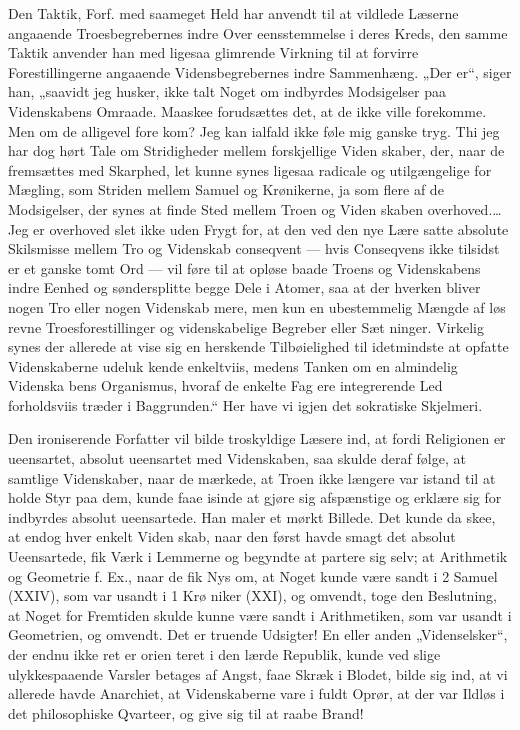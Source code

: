 \documentclass[12pt]{book}
\newcommand{\opage}[1]{\marginnote{\footnotesize\textit{[#1]}}}
\begin{document}
Den Taktik, Forf. med saameget Held har anvendt til
at vildlede Læserne angaaende Troesbegrebernes indre Over\-%
eensstemmelse i deres Kreds, den samme Taktik anvender han
med ligesaa glimrende Virkning til at forvirre Forestillingerne
angaaende Vidensbegrebernes indre Sammenhæng. „Der er“,
siger han, „saavidt jeg husker, ikke talt Noget om indbyrdes
Modsigelser paa Videnskabens Omraade. Maaskee forudsættes
det, at de ikke ville forekomme. Men om de alligevel fore\-%
kom? Jeg kan ialfald ikke føle mig ganske tryg. Thi jeg
har dog hørt Tale om Stridigheder mellem forskjellige Viden\-%
skaber, der, naar de fremsættes med Skarphed, let kunne
synes ligesaa radicale og utilgængelige for Mægling, som
Striden mellem Samuel og Krønikerne, ja som flere af de
Modsigelser, der synes at finde Sted mellem Troen og Viden\-%
skaben overhoved.\ldots{} Jeg er overhoved slet ikke uden Frygt
for, at den ved den nye Lære satte absolute Skilsmisse mellem
Tro og Videnskab conseqvent --- hvis Conseqvens ikke tilsidst
er et ganske tomt Ord --- vil føre til at opløse baade Troens
og Videnskabens indre Eenhed og søndersplitte begge Dele i
Atomer, saa at der hverken bliver nogen Tro eller nogen
Videnskab mere, men kun en ubestemmelig Mængde af løs\-%
revne Troesforestillinger og videnskabelige Begreber eller Sæt\-%
ninger. Virkelig synes der allerede at vise sig en herskende
Tilbøielighed til idetmindste at opfatte Videnskaberne udeluk\-%
kende enkeltviis, medens Tanken om en almindelig Videnska\-%
bens Organismus, hvoraf de enkelte Fag ere integrerende Led
\opage{317}\setcounter{footnote}{0}%
forholdsviis træder i Baggrunden.“ Her have vi igjen det
sokratiske Skjelmeri.

Den ironiserende Forfatter vil bilde troskyldige Læsere
ind, at fordi Religionen er ueensartet, absolut ueensartet med
Videnskaben, saa skulde deraf følge, at samtlige Videnskaber,
naar de mærkede, at Troen ikke længere var istand til at holde
Styr paa dem, kunde faae isinde at gjøre sig afspænstige og
erklære sig for indbyrdes absolut ueensartede. Han maler et
mørkt Billede. Det kunde da skee, at endog hver enkelt Viden\-%
skab, naar den først havde smagt det absolut Ueensartede, fik
Værk i Lemmerne og begyndte at partere sig selv; at Arithmetik
og Geometrie f. Ex., naar de fik Nys om, at Noget kunde
være sandt i 2 Samuel (XXIV), som var usandt i 1 Krø\-%
niker (XXI), og omvendt, toge den Beslutning, at Noget for
Fremtiden skulde kunne være sandt i Arithmetiken, som var
usandt i Geometrien, og omvendt. Det er truende Udsigter!
En eller anden „Videnselsker“, der endnu ikke ret er orien\-%
teret i den lærde Republik, kunde ved slige ulykkespaaende
Varsler betages af Angst, faae Skræk i Blodet, bilde sig ind,
at vi allerede havde Anarchiet, at Videnskaberne vare i fuldt
Oprør, at der var Ildløs i det philosophiske Qvarteer, og give
sig til at raabe Brand!
\end{document}
